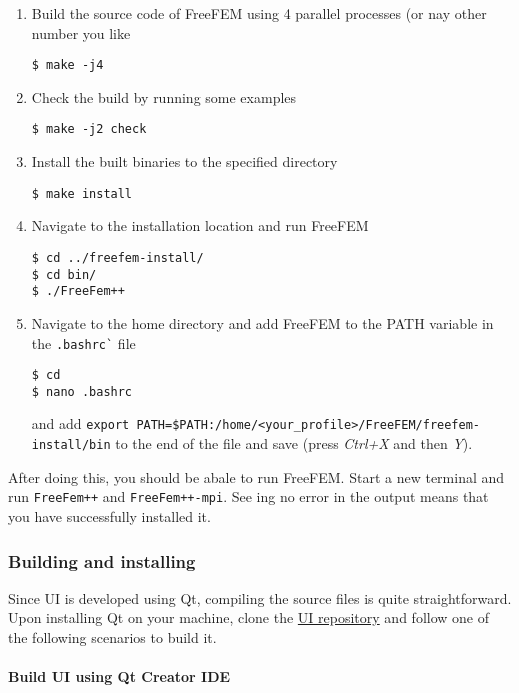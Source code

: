 \begin{enumerate}
\item Build the source code of FreeFEM using 4 parallel processes (or nay other number you like
\begin{verbatim}
$ make -j4
\end{verbatim}

\item Check the build by running some examples
\begin{verbatim}
$ make -j2 check
\end{verbatim}

\item Install the built binaries to the specified directory
\begin{verbatim}
$ make install
\end{verbatim}

\item Navigate to the installation location and run FreeFEM
\begin{verbatim}
$ cd ../freefem-install/
$ cd bin/
$ ./FreeFem++
\end{verbatim}

\item Navigate to the home directory and add FreeFEM to the PATH variable in the \verb|.bashrc`| file
\begin{verbatim}
$ cd
$ nano .bashrc
\end{verbatim}
and add \verb|export PATH=$PATH:/home/<your_profile>/FreeFEM/freefem-install/bin| to the end of the file and save (press \textit{Ctrl+X} and then \textit{Y}).

\end{enumerate}

After doing this, you should be abale to run FreeFEM. Start a new terminal and run \verb|FreeFem++| and \verb|FreeFem++-mpi|. See ing no error in the output means that you have successfully installed it.

\subsubsection{Building and installing \biodeg{}}

Since \biodeg{} UI is developed using Qt, compiling the source files is quite straightforward. Upon installing Qt on your machine, clone the \href{https://github.com/mbarzegary/BioDeg-UI}{\biodeg{} UI repository} and follow one of the following scenarios to build it. 

\paragraph{Build \biodeg{} UI using Qt Creator IDE}

